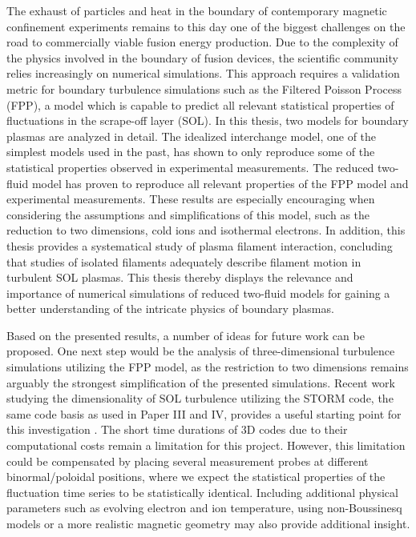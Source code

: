 The exhaust of particles and heat in the boundary of contemporary magnetic confinement experiments remains to this day one of the biggest challenges on the road to commercially viable fusion energy production. Due to the complexity of the physics involved in the boundary of fusion devices, the scientific community relies increasingly on numerical simulations. This approach requires a validation metric for boundary turbulence simulations such as the Filtered Poisson Process (FPP), a model which is capable to predict all relevant statistical properties of fluctuations in the scrape-off layer (SOL). In this thesis, two models for boundary plasmas are analyzed in detail. The idealized interchange model, one of the simplest models used in the past, has shown to only reproduce some of the statistical properties observed in experimental measurements. The reduced two-fluid model has proven to reproduce all relevant properties of the FPP model and experimental measurements. These results are especially encouraging when considering the assumptions and simplifications of this model, such as the reduction to two dimensions, cold ions and isothermal electrons. In addition, this thesis provides a systematical study of plasma filament interaction, concluding that studies of isolated filaments adequately describe filament motion in turbulent SOL plasmas. This thesis thereby displays the relevance and importance of numerical simulations of reduced two-fluid models for gaining a better understanding of the intricate physics of boundary plasmas. 

Based on the presented results, a number of ideas for future work can be proposed. One next step would be the analysis of three-dimensional turbulence simulations utilizing the FPP model, as the restriction to two dimensions remains arguably the strongest simplification of the presented simulations. Recent work studying the dimensionality of SOL turbulence utilizing the STORM code, the same code basis as used in Paper III and IV, provides a useful starting point for this investigation \cite{nicholas_dim,Nicholas2021comparing}. The short time durations of 3D codes due to their computational costs remain a limitation for this project. However, this limitation could be compensated by placing several measurement probes at different binormal/poloidal positions, where we expect the statistical properties of the fluctuation time series to be statistically identical. Including additional physical parameters such as evolving electron and ion temperature, using non-Boussinesq models or a more realistic magnetic geometry may also provide additional insight. 

